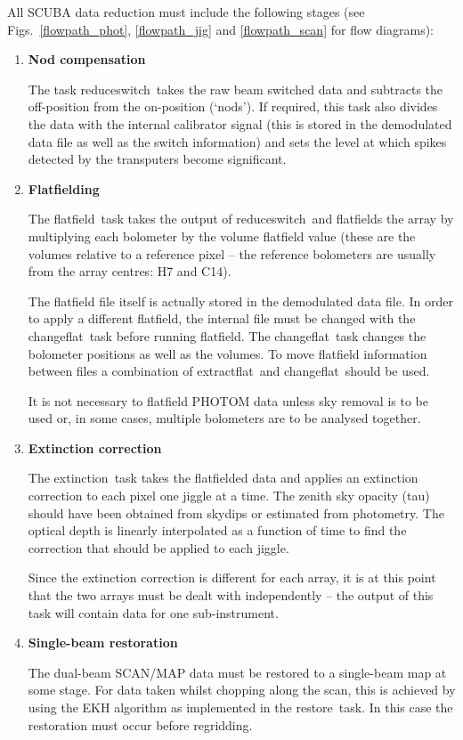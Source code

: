\documentclass[twoside,11pt]{article}
\newcommand{\task}[1]{{\sf #1}}
\newcommand{\chgflat}{\htmlref{\task{change\_flat}}{CHANGE_FLAT}}
\newcommand{\resw}{\htmlref{\task{reduce\_switch}}{REDUCE_SWITCH}}
\newcommand{\flatf}{\htmlref{\task{flatfield}}{FLATFIELD}}
\newcommand{\ext}{\htmlref{\task{extinction}}{EXTINCTION}}
\newcommand{\restore}{\htmlref{\task{restore}}{RESTORE}}
\newcommand{\extflat}{\htmlref{\task{extract\_flat}}{EXTRACT_FLAT}}
\newcommand{\htmlref}[2]{#1}
\renewcommand{\_}{\texttt{\symbol{95}}}
\begin{document}
All SCUBA data reduction must include the following stages (see Figs.\
\ref{flowpath_phot}, \ref{flowpath_jig} and \ref{flowpath_scan} for flow 
diagrams):
\begin{enumerate}
\item {\bf Nod compensation} 

The task \resw\ takes the raw beam switched data and subtracts the
off-position from the on-position (`nods'). If required, this task also
divides the data with the internal calibrator signal (this is stored in
the demodulated data file as well as the switch information) and sets the
level at which spikes detected by the transputers become significant. 

\item {\bf Flatfielding}

The \flatf\ task takes the output of \resw\ and flatfields the array by
multiplying each bolometer by the volume flatfield value (these are the
volumes relative to a reference pixel -- the reference bolometers are 
usually from the array centres: H7 and C14).

The flatfield file itself is actually stored in the demodulated data file. In
order to apply a different flatfield, the internal file must be changed with
the \chgflat\ task before running \flatf.  The \chgflat\ task changes the
bolometer positions as well as the volumes. To move flatfield information
between files a combination of \extflat\ and \chgflat\ should be used.

It is not necessary to flatfield PHOTOM data unless sky removal is to be used
or, in some cases, multiple bolometers are to be analysed together.

\item {\bf Extinction correction}

The \ext\ task takes the flatfielded data and applies an extinction
correction to each pixel one jiggle at a time. The zenith sky opacity (tau)
should have been obtained from skydips or estimated from photometry. The
optical depth is linearly interpolated as a function of time to find the
correction that should be applied to each jiggle.

Since the extinction correction is different for each array, it is at this
point that the two arrays must be dealt with independently -- the output of
this task will contain data for one sub-instrument.


\item {\bf Single-beam restoration}

The dual-beam SCAN/MAP data must be restored to a single-beam map
at some stage. For data taken whilst chopping along the scan, this 
is achieved by using the EKH algorithm \cite{ekh} as implemented in the 
\restore\ task. In this case the restoration must occur before regridding.


\end{enumerate}
\end{document}
